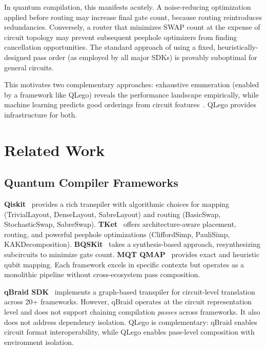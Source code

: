 \documentclass[conference]{IEEEtran}
\begin{document}
In quantum compilation, this manifests acutely.
A noise-reducing optimization applied before routing may increase final gate count, because routing reintroduces redundancies.
Conversely, a router that minimizes SWAP count at the expense of circuit topology may prevent subsequent peephole optimizers from finding cancellation opportunities.
The standard approach of using a fixed, heuristically-designed pass order (as employed by all major SDKs) is provably suboptimal for general circuits.

This motivates two complementary approaches: exhaustive enumeration (enabled by a framework like QLego) reveals the performance landscape empirically, while machine learning predicts good orderings from circuit features~\cite{quetschlich2024mqtpredictor, mills2026rl}.
QLego provides infrastructure for both.


\section{Related Work}
\label{sec:relatedwork}

\subsection{Quantum Compiler Frameworks}

\textbf{Qiskit}~\cite{qiskit} provides a rich transpiler with algorithmic choices for mapping (TrivialLayout, DenseLayout, SabreLayout) and routing (BasicSwap, StochasticSwap, SabreSwap).
\textbf{TKet}~\cite{sivarajah2020tket} offers architecture-aware placement, routing, and powerful peephole optimizations (CliffordSimp, PauliSimp, KAKDecomposition).
\textbf{BQSKit}~\cite{patel2022bqskit} takes a synthesis-based approach, resynthesizing subcircuits to minimize gate count.
\textbf{MQT QMAP}~\cite{mqt} provides exact and heuristic qubit mapping.
Each framework excels in specific contexts but operates as a monolithic pipeline without cross-ecosystem pass composition.

\textbf{qBraid SDK}~\cite{qbraid} implements a graph-based transpiler for circuit-level translation across 20+ frameworks.
However, qBraid operates at the circuit representation level and does not support chaining compilation \textit{passes} across frameworks.
It also does not address dependency isolation.
QLego is complementary: qBraid enables circuit format interoperability, while QLego enables pass-level composition with environment isolation.
\end{document}
